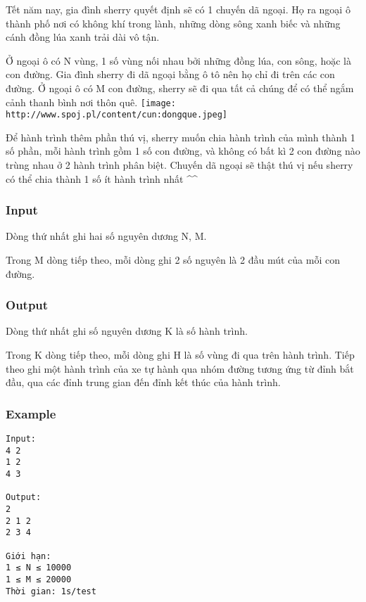 



   Tết năm nay, gia đình sherry quyết định sẽ có 1 chuyến dã ngoại. Họ ra ngoại ô thành phố nơi có không khí trong lành, những dòng sông xanh biếc và những cánh đồng lúa xanh trải dài vô tận.  

   Ở ngoại ô có N vùng, 1 số vùng nối nhau bởi những đồng lúa, con sông, hoặc là con đường. Gia đình sherry đi dã ngoại bằng ô tô nên họ chỉ đi trên các con đường. Ở ngoại ô có M con đường, sherry sẽ đi qua tất cả chúng để có thể ngắm cảnh thanh bình nơi thôn quê.  
\texttt{[image: http://www.spoj.pl/content/cun:dongque.jpeg]}

   Để hành trình thêm phần thú vị, sherry muốn chia hành trình của mình thành 1 số phần, mỗi hành trình gồm 1 số con đường, và không có bất kì 2 con đường nào trùng nhau ở 2 hành trình phân biệt. Chuyến dã ngoại sẽ thật thú vị nếu sherry có thể chia thành 1 số ít hành trình nhất \textasciicircum\textasciicircum  

\subsubsection{   Input  }

   Dòng thứ nhất ghi hai số nguyên dương N, M.  

   Trong M dòng tiếp theo, mỗi dòng ghi 2 số nguyên là 2 đầu mút của mỗi con đường.  

\subsubsection{   Output  }

   Dòng thứ nhất ghi số nguyên dương K là số hành trình.  

   Trong K dòng tiếp theo, mỗi dòng ghi H là số vùng đi qua trên hành trình. Tiếp theo ghi một hành trình của xe tự hành qua nhóm đường tương ứng từ đỉnh bắt đầu, qua các đỉnh trung gian đến đỉnh kết thúc của hành trình.  

\subsubsection{   Example  }
\begin{verbatim}
Input:
4 2
1 2
4 3

Output:
2
2 1 2
2 3 4

Giới hạn:
1 ≤ N ≤ 10000
1 ≤ M ≤ 20000
Thời gian: 1s/test
\end{verbatim}
